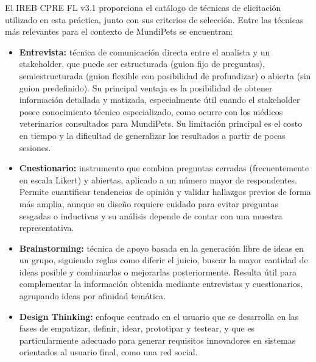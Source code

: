 \documentclass[journal,onecolumn]{IEEEtran}
\begin{document}
El IREB CPRE FL v3.1 \cite{ireb2023} proporciona el catálogo de técnicas de
elicitación utilizado en esta práctica, junto con sus criterios de
selección. Entre las técnicas más relevantes para el contexto de MundiPets
se encuentran:

\begin{itemize}[leftmargin=*]
  \item \textbf{Entrevista:} técnica de comunicación directa entre el
  analista y un stakeholder, que puede ser estructurada (guion fijo de
  preguntas), semiestructurada (guion flexible con posibilidad de
  profundizar) o abierta (sin guion predefinido). Su principal ventaja es
  la posibilidad de obtener información detallada y matizada, especialmente
  útil cuando el stakeholder posee conocimiento técnico especializado, como
  ocurre con los médicos veterinarios consultados para MundiPets. Su
  limitación principal es el costo en tiempo y la dificultad de
  generalizar los resultados a partir de pocas sesiones.

  \item \textbf{Cuestionario:} instrumento que combina preguntas cerradas
  (frecuentemente en escala Likert) y abiertas, aplicado a un número mayor
  de respondentes. Permite cuantificar tendencias de opinión y validar
  hallazgos previos de forma más amplia, aunque su diseño requiere cuidado
  para evitar preguntas sesgadas o inductivas y su análisis depende de
  contar con una muestra representativa.

  \item \textbf{Brainstorming:} técnica de apoyo basada en la generación
  libre de ideas en un grupo, siguiendo reglas como diferir el juicio,
  buscar la mayor cantidad de ideas posible y combinarlas o mejorarlas
  posteriormente. Resulta útil para complementar la información obtenida
  mediante entrevistas y cuestionarios, agrupando ideas por afinidad
  temática.

  \item \textbf{Design Thinking:} enfoque centrado en el usuario que se
  desarrolla en las fases de empatizar, definir, idear, prototipar y
  testear, y que es particularmente adecuado para generar requisitos
  innovadores en sistemas orientados al usuario final, como una red social.
\end{itemize}
\end{document}
